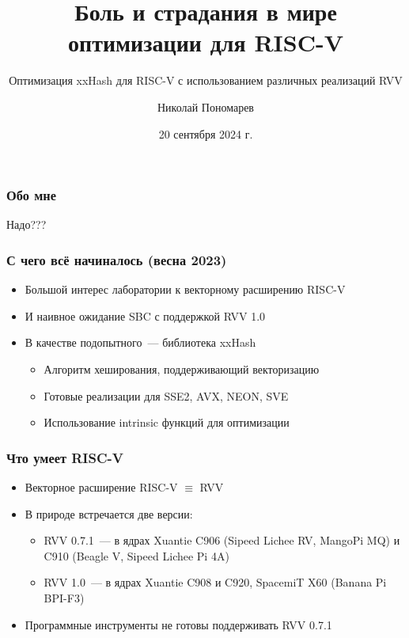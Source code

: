 \documentclass[aspectratio=169, handout]{beamer}
\title[Оптимизация xxHash для RISC-V]{Боль и страдания в мире оптимизации для RISC-V}
\subtitle{Оптимизация xxHash для RISC-V с использованием различных реализаций RVV}
\author{Николай Пономарев}
\institute[Матмех СПбГУ]{Математико-механический факультет СПбГУ}
\date{20 сентября 2024 г.}
\begin{document}
\begin{frame}
    \maketitle
\end{frame}

\begin{frame}
    \frametitle{Обо мне}

    Надо???

\end{frame}

\begin{frame}
    \frametitle{С чего всё начиналось (весна 2023)}

    \begin{itemize}[<+->]
        \item Большой интерес лаборатории к векторному расширению RISC-V
        \item И наивное ожидание SBC с поддержкой RVV 1.0
        \item В качестве подопытного~--- библиотека xxHash
              \begin{itemize}
                  \item Алгоритм хеширования, поддерживающий векторизацию
                  \item Готовые реализации для SSE2, AVX, NEON, SVE
                  \item Использование intrinsic функций для оптимизации
              \end{itemize}
    \end{itemize}

\end{frame}


\begin{frame}
    \frametitle{Что умеет RISC-V}

    \begin{itemize}
        \item Векторное расширение RISC-V $\equiv$ RVV
        \item В природе встречается две версии:
              \begin{itemize}
                  \item RVV 0.7.1~--- в ядрах Xuantie C906 (Sipeed Lichee RV, MangoPi MQ) и C910 (Beagle V, Sipeed Lichee Pi 4A)
                  \item RVV 1.0~--- в ядрах Xuantie C908 и C920, SpacemiT X60 (Banana Pi BPI-F3)
              \end{itemize}
        \item<+-> Программные инструменты не готовы поддерживать RVV 0.7.1
    \end{itemize}

    \ %


\end{frame}
\end{document}
